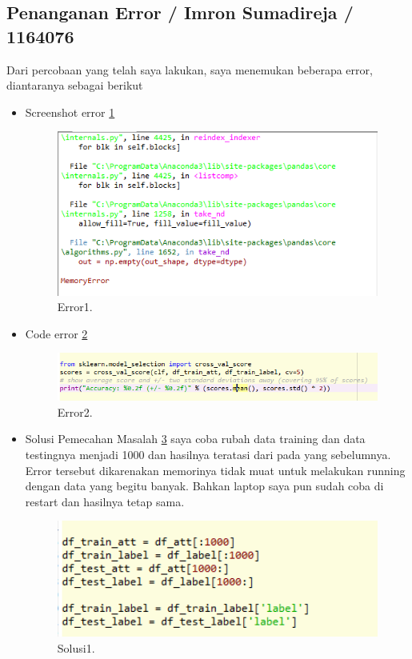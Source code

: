 \subsection{Penanganan Error / Imron Sumadireja / 1164076}
Dari percobaan yang telah saya lakukan, saya menemukan beberapa error, diantaranya sebagai berikut
\begin{itemize}
\item Screenshot error \ref{error1}
 		\begin{figure}[ht]
		\centerline{\includegraphics[width=1\textwidth]{figures/im/error1.png}}
		\caption{Error1.}
		\label{error1}
		\end{figure}

\item Code error \ref{error2}
 		\begin{figure}[ht]
		\centerline{\includegraphics[width=1\textwidth]{figures/im/error2.png}}
		\caption{Error2.}
		\label{error2}
		\end{figure}

\item Solusi Pemecahan Masalah \ref{sol1} saya coba rubah data training dan data testingnya menjadi 1000 dan hasilnya teratasi dari pada yang sebelumnya. Error tersebut dikarenakan memorinya tidak muat untuk melakukan running dengan data yang begitu banyak. Bahkan laptop saya pun sudah coba di restart dan hasilnya tetap sama.
 		\begin{figure}[ht]
		\centerline{\includegraphics[width=1\textwidth]{figures/im/sol1.png}}
		\caption{Solusi1.}
		\label{sol1}
		\end{figure}

\end{itemize}


